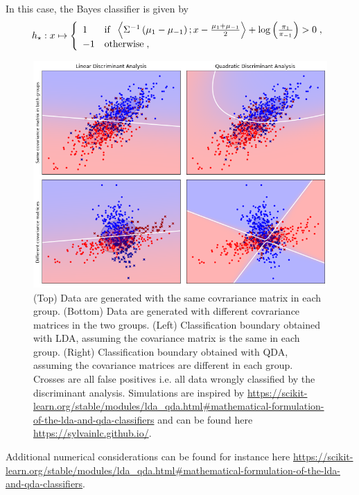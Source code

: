 In this case, the Bayes classifier is given by
\[
h_{\star}: x\mapsto  \left\{
    \begin{array}{ll}
       1 & \mbox{if }\; \left\langle \Sigma^{-1}\left(\mu_1-\mu_{-1}\right);x - \frac{\mu_1  +\mu_{-1}}{2}\right\rangle + \log\left(\frac{\pi_{1}}{\pi_{-1}}\right)>0\;, \\
        -1 & \mbox{otherwise}\;,
    \end{array}
\right.
\]
\begin{figure}
\begin{center}
\includegraphics[width = .8\linewidth]{./Illustrations/lda_plot.png}
\end{center}
\caption{(Top) Data are generated with the same covrariance matrix in each group. (Bottom) Data are generated with different covrariance matrices in the two groups.  (Left) Classification boundary obtained with LDA, assuming the covariance matrix is the same in each group. (Right)  Classification boundary obtained with QDA, assuming the covariance matrices are different in each group. Crosses are all false positives i.e. all data wrongly classified by the discriminant analysis. Simulations are inspired by \url{https://scikit-learn.org/stable/modules/lda_qda.html\#mathematical-formulation-of-the-lda-and-qda-classifiers} and can be found here \url{https://sylvainlc.github.io/}.}
\end{figure}
Additional numerical considerations can be found for instance here \url{https://scikit-learn.org/stable/modules/lda_qda.html#mathematical-formulation-of-the-lda-and-qda-classifiers}.


